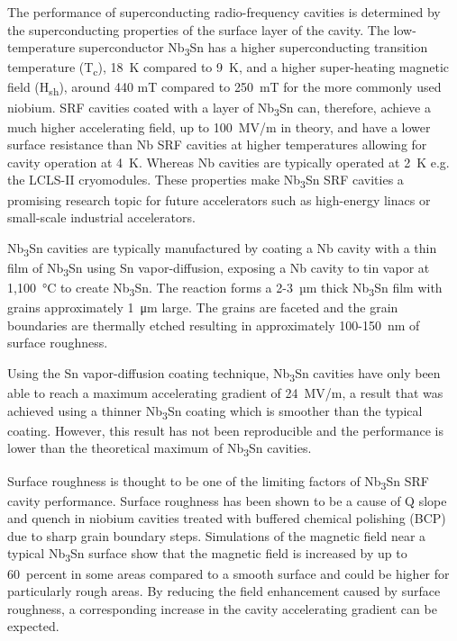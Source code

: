 \documentclass[reprint,amsmath,amssymb,aps]{revtex4-2}%
\begin{document}
The performance of superconducting radio-frequency cavities is determined by the superconducting properties of the surface layer of the cavity. The low-temperature superconductor Nb\textsubscript{3}Sn has a higher superconducting transition temperature (T\textsubscript{c}), 18~K compared to 9~K, and a higher super-heating magnetic field (H\textsubscript{sh}), around 440 mT compared to 250~mT for the more commonly used niobium\cite{liarte2017theoretical, catelani2008temperature, lin2012effect, kubo2020superfluid}. SRF cavities coated with a layer of Nb\textsubscript{3}Sn can, therefore, achieve a much higher accelerating field, up to 100~MV/m in theory, and have a lower surface resistance than Nb SRF cavities at higher temperatures allowing for cavity operation at 4~K. Whereas Nb cavities are typically operated at 2~K e.g. the LCLS-II cryomodules\cite{galayda2018lcls}. These properties make Nb\textsubscript{3}Sn SRF cavities a promising research topic for future accelerators such as high-energy linacs or small-scale industrial accelerators.

Nb\textsubscript{3}Sn cavities are typically manufactured by coating a Nb cavity with a thin film of Nb\textsubscript{3}Sn using Sn vapor-diffusion\cite{posen2017nb3sn, pudasaini2019growth, porter2018update}, exposing a Nb cavity to tin vapor at 1,100~°C to create Nb\textsubscript{3}Sn. The reaction forms a 2-3~µm thick Nb\textsubscript{3}Sn film with grains approximately 1~\unit{\micro\metre} large. The grains are faceted and the grain boundaries are thermally etched resulting in approximately 100-150~nm of surface roughness. 

Using the Sn vapor-diffusion coating technique\cite{posen2017nb3sn,pudasaini2019growth,eremeev2013development}, Nb\textsubscript{3}Sn cavities have only been able to reach a maximum accelerating gradient of 24~MV/m\cite{posen2021advances}, a result that was achieved using a thinner Nb\textsubscript{3}Sn coating which is smoother than the typical coating. However, this result has not been reproducible and the performance is lower than the theoretical maximum of Nb\textsubscript{3}Sn cavities.

Surface roughness is thought to be one of the limiting factors of Nb\textsubscript{3}Sn SRF cavity performance. Surface roughness has been shown to be a cause of Q slope and quench in niobium cavities treated with buffered chemical polishing (BCP) due to sharp grain boundary steps.\cite{knobloch1999high, xu2016simulation} Simulations of the magnetic field near a typical Nb\textsubscript{3}Sn surface show that the magnetic field is increased by up to 60~percent in some areas compared to a smooth surface\cite{porter2016surface, kubo2015magnetic} and could be higher for particularly rough areas. By reducing the field enhancement caused by surface roughness, a corresponding increase in the cavity accelerating gradient can be expected. 
\end{document}
